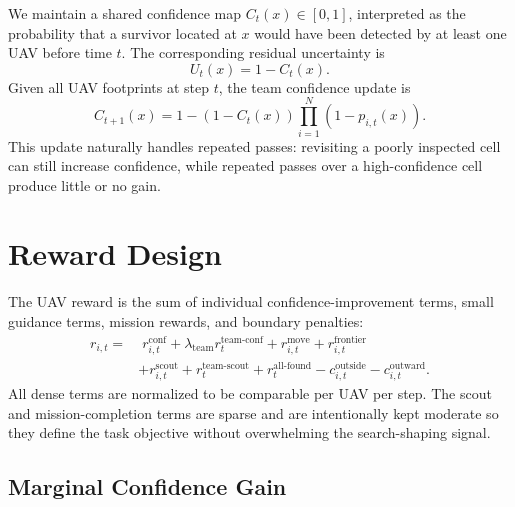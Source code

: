\documentclass{article}
\newcommand{\conf}{C}
\newcommand{\unc}{U}
\begin{document}
We maintain a shared confidence map \(\conf_t(x) \in [0,1]\), interpreted as the
probability that a survivor located at \(x\) would have been detected by at
least one UAV before time \(t\). The corresponding residual uncertainty is
\begin{equation}
    \unc_t(x) = 1 - \conf_t(x).
\end{equation}
Given all UAV footprints at step \(t\), the team confidence update is
\begin{equation}
    \conf_{t+1}(x)
    =
    1
    -
    (1-\conf_t(x))
    \prod_{i=1}^{N} (1 - p_{i,t}(x)).
    \label{eq:confidence_update}
\end{equation}
This update naturally handles repeated passes: revisiting a poorly inspected
cell can still increase confidence, while repeated passes over a high-confidence
cell produce little or no gain.

\section{Reward Design}

The UAV reward is the sum of individual confidence-improvement terms, small
guidance terms, mission rewards, and boundary penalties:
\begin{equation}
\begin{aligned}
    r_{i,t}
    =
    &\; r^{\mathrm{conf}}_{i,t}
    + \lambda_{\mathrm{team}} r^{\mathrm{team\text{-}conf}}_{t}
    + r^{\mathrm{move}}_{i,t}
    + r^{\mathrm{frontier}}_{i,t} \\
    &+ r^{\mathrm{scout}}_{i,t}
    + r^{\mathrm{team\text{-}scout}}_{t}
    + r^{\mathrm{all\text{-}found}}_{t}
    - c^{\mathrm{outside}}_{i,t}
    - c^{\mathrm{outward}}_{i,t}.
    \label{eq:total_reward}
\end{aligned}
\end{equation}
All dense terms are normalized to be comparable per UAV per step. The scout and
mission-completion terms are sparse and are intentionally kept moderate so they
define the task objective without overwhelming the search-shaping signal.

\subsection{Marginal Confidence Gain}
\end{document}
